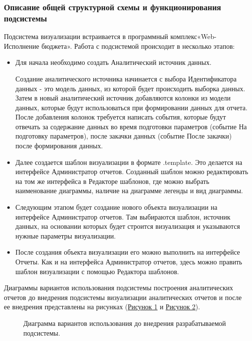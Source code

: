 \documentclass[a4paper]{extarticle}
\begin{document}
\subsubsection{Описание общей структурной схемы и функционирования подсистемы}
Подсистема визуализации встраивается в программный комплекс\newline «Web-Исполнение бюджета». Работа с подсистемой происходит в несколько этапов:\par
\begin{itemize}
	\item Для начала необходимо создать Аналитический источник данных.\par
  Создание аналитического источника начинается с выбора Идентификатора данных - это модель данных, из которой будет происходить выборка данных. Затем в новый аналитический источник добавляются колонки из модели данных, которые будут использоваться при формировании данных для отчета. После добавления колонок требуется написать события, которые будут отвечать за содержание данных во время подготовки параметров (событие На подготовку параметров), после закачки данных (событие После закачки) после формирования данных.
	\item Далее создается шаблон визуализации в формате .template. Это делается на интерфейсе Администратор отчетов.
  Созданный шаблон можно редактировать на том же интерфейса в Редакторе шаблонов, где можно выбрать наименование диаграммы, наличие на диаграмме легенды и вид диаграммы.
    \item Следующим этапом будет создание нового объекта визуализации на интерфейсе Администратор отчетов. Там выбираются шаблон, источник данных, на основании которых будет строится визуализация и указываются нужные параметры визуализации.
    \item После создания объекта визуализации его можно выполнить на интерфейсе Отчеты. Как и на интерфейса Администратор отчетов, здесь можно править шаблон визуализации с помощью Редактора шаблонов.
\end{itemize}\par
Диаграммы вариантов использования подсистемы построения аналитических отчетов до внедрения подсистемы визуализации аналитических отчетов и после ее внедрения представлены на рисунках (\hyperref[ris1]{Рисунок 1} и \hyperref[ris2]{Рисунок 2}).
\begin{figure}[H]
\caption{Диаграмма вариантов использования до внедрения разрабатываемой подсистемы.}
\label{ris1}
\end{figure}\par
\end{document}

